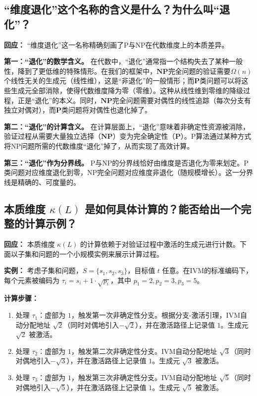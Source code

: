 \documentclass{ctexart}
\begin{document}
	
	\subsection{``维度退化''这个名称的含义是什么？为什么叫``退化''？}
	
	\textbf{回应：} ``维度退化''这一名称精确刻画了P与NP在代数维度上的本质差异。
	
	\textbf{第一：``退化''的数学含义。} 在代数中，``退化''通常指一个结构失去了某种一般性，降到了更低维的特殊情形。在我们的框架中，$\mathbf{NP}$完全问题的验证需要$\Omega(n)$个线性无关的生成元（线性维），这是``非退化''的一般情形；而$\mathbf{P}$类问题可以将这些生成元全部消除，使得代数维度降为零（零维）。这种从线性维到零维的降级过程，正是``退化''的本义。同时，$\mathbf{NP}$完全问题需要对偶性的线性追踪（每次分支有独立对偶对），而$\mathbf{P}$类问题将对偶性也退化掉了。
	
	\textbf{第二：``退化''的计算含义。} 在计算层面上，``退化''意味着非确定性资源被消除，验证过程从需要大量独立选择（$\mathbf{NP}$）变为完全确定性（$\mathbf{P}$）。P算法通过某种方式将NP问题所需的代数维度``退化''掉了，从而实现了高效计算。
	
	\textbf{第三：``退化''作为分界线。} P与NP的分界线恰好由维度是否退化为零来划定。P类问题对应维度退化到零，NP完全问题对应维度非退化（随规模增长）。这一分界线是精确的、可度量的。
	
	
	\subsection{本质维度 $\kappa(L)$ 是如何具体计算的？能否给出一个完整的计算示例？}
	
	\textbf{回应：} 本质维度 $\kappa(L)$ 的计算依赖于对验证过程中激活的生成元进行计数。下面以子集和问题的一个小规模实例来展示计算过程。
	
	\textbf{实例：} 考虑子集和问题，$S = \{s_1, s_2, s_3\}$，目标值 $t$ 任意。在IVM的标准编码下，每个元素被编码为 $\tau_i = s_i + 1 \cdot \sqrt{p_i}$，其中 $p_1=2, p_2=3, p_3=5$。
	
	\textbf{计算步骤：}
	\begin{enumerate}
		\item 处理 $\tau_1$：虚部为 $1$，触发第一次非确定性分支。根据分支-激活引理，IVM自动分配地址 $\sqrt{2}$（同时对偶地引入$-\sqrt{2}$），并在激活路径上记录值 $1$。生成元 $\sqrt{2}$ 被激活。
		\item 处理 $\tau_2$：虚部为 $1$，触发第二次非确定性分支。IVM自动分配地址 $\sqrt{3}$（同时对偶地引入$-\sqrt{3}$），并在激活路径上记录值 $1$。生成元 $\sqrt{3}$ 被激活。
		\item 处理 $\tau_3$：虚部为 $1$，触发第三次非确定性分支。IVM自动分配地址 $\sqrt{5}$（同时对偶地引入$-\sqrt{5}$），并在激活路径上记录值 $1$。生成元 $\sqrt{5}$ 被激活。
	\end{enumerate}
	
\end{document}
